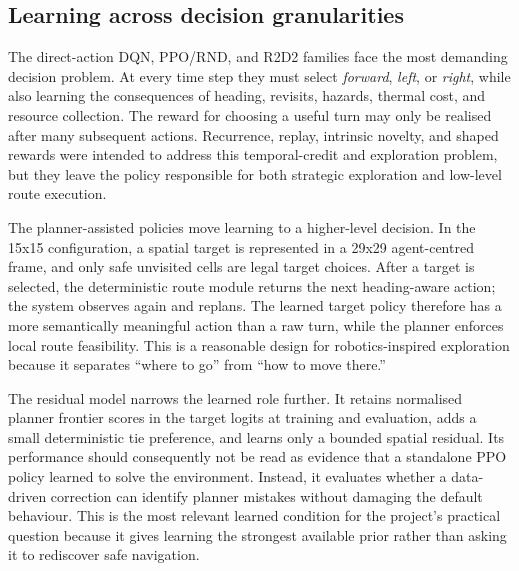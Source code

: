 \documentclass[10pt,letterpaper]{article}
\begin{document}
\subsection{Learning across decision granularities}

The direct-action DQN, PPO/RND, and R2D2 families face the most demanding
decision problem. At every time step they must select \textit{forward},
\textit{left}, or \textit{right}, while also learning the consequences of
heading, revisits, hazards, thermal cost, and resource collection. The reward
for choosing a useful turn may only be realised after many subsequent actions.
Recurrence, replay, intrinsic novelty, and shaped rewards were intended to
address this temporal-credit and exploration problem, but they leave the
policy responsible for both strategic exploration and low-level route
execution.

The planner-assisted policies move learning to a higher-level decision. In the
15x15 configuration, a spatial target is represented in a 29x29 agent-centred
frame, and only safe unvisited cells are legal target choices. After a target
is selected, the deterministic route module returns the next heading-aware
action; the system observes again and replans. The learned target policy
therefore has a more semantically meaningful action than a raw turn, while
the planner enforces local route feasibility. This is a reasonable design for
robotics-inspired exploration because it separates ``where to go'' from ``how
to move there.''

The residual model narrows the learned role further. It retains normalised
planner frontier scores in the target logits at training and evaluation, adds a
small deterministic tie preference, and learns only a bounded spatial
residual. Its performance should consequently not be read as evidence that a
standalone PPO policy learned to solve the environment. Instead, it evaluates
whether a data-driven correction can identify planner mistakes without
damaging the default behaviour. This is the most relevant learned condition
for the project's practical question because it gives learning the strongest
available prior rather than asking it to rediscover safe navigation.
\end{document}
